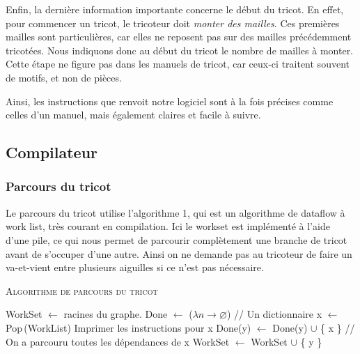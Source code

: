 \documentclass{article}
\begin{document}
Enfin, la dernière information importante concerne le début du tricot. En effet, pour commencer un tricot, 
le tricoteur doit \emph{monter des mailles}. Ces premières mailles sont particulières, car elles ne 
reposent pas sur des mailles précédemment tricotées. Nous indiquons donc au début du tricot le nombre de 
mailles à monter. Cette étape ne figure pas dans les manuels de tricot, car ceux-ci traitent souvent de 
motifs, et non de pièces.

Ainsi, les instructions que renvoit notre logiciel sont à la fois précises comme celles d'un manuel, mais 
également claires et facile à suivre. 

\subsection{Compilateur}

\subsubsection{Parcours du tricot}

Le parcours du tricot utilise l'algorithme 1, qui est un algorithme de
dataflow à work list, très courant en compilation. Ici le workset est
implémenté à l'aide d'une pile, ce qui nous permet de parcourir
complètement une branche de tricot avant de s'occuper d'une
autre. Ainsi on ne demande pas au tricoteur de faire un va-et-vient
entre plusieurs aiguilles si ce n'est pas nécessaire.

\begin{algorithm}\label{algo}
\caption{\textsc{Algorithme de parcours du tricot}}
\begin{algorithmic}[1]
\State WorkSet $\leftarrow$ racines du graphe.
\State Done $\leftarrow$ ($\lambda n \to \varnothing$) // Un dictionnaire
  \State x $\leftarrow$ Pop\,(WorkList)
  \State Imprimer les instructions pour x
    \State Done(y) $\leftarrow$ Done(y) $\cup$ \{ x \}
     // On a parcouru toutes les dépendances de x
      \State WorkSet $\leftarrow$ WorkSet $\cup$ \{ y \}
    \EndIf
  \EndFor


\EndWhile

\end{algorithmic}
\end{algorithm}
\end{document}
